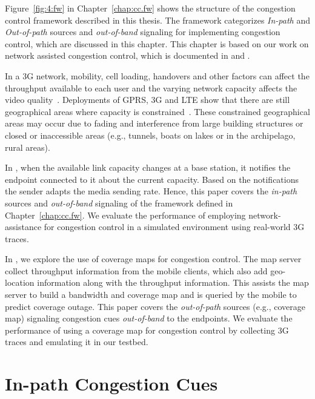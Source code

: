 Figure~\ref{fig:4:fw} in Chapter~\ref{chap:cc.fw} shows the structure of the
congestion control framework described in this thesis. The framework
categorizes \emph{In-path} and \emph{Out-of-path} sources and
\emph{out-of-band} signaling for implementing congestion control, which are
discussed in this chapter. This chapter is based on our work on network
assisted congestion control, which is documented in  and
.

In a 3G network, mobility, cell loading, handovers and other factors can
affect the throughput available to each user and the varying network capacity
affects the video quality~\cite{diaz2007evaluating}. Deployments of GPRS, 3G
and LTE show that there are still geographical areas where capacity is
constrained~\cite{Curcio:glass, 6576402}. These constrained geographical areas
may occur due to fading and interference from large building structures or
closed or inaccessible areas (e.g., tunnels, boats on lakes or in the
archipelago, rural areas).

In , when the available link capacity changes at a base
station, it notifies the endpoint connected to it about the current capacity.
Based on the notifications the sender adapts the media sending rate. Hence,
this paper covers the \emph{in-path} sources and \emph{out-of-band} signaling
of the framework defined in Chapter~\ref{chap:cc.fw}. We evaluate the
performance of employing network-assistance for congestion control in a
simulated environment using real-world 3G traces.

In , we explore the use of coverage maps for congestion
control. The map server collect throughput information from the mobile
clients, which also add geo-location information along with the throughput
information. This assists the map server to build a bandwidth and coverage map
and is queried by the mobile to predict coverage outage. This paper covers the
\emph{out-of-path} sources (e.g., coverage map) signaling congestion cues
\emph{out-of-band} to the endpoints. We evaluate the performance of using a
coverage map for congestion control by collecting 3G traces and emulating it
in our testbed.

\section{In-path Congestion Cues}


